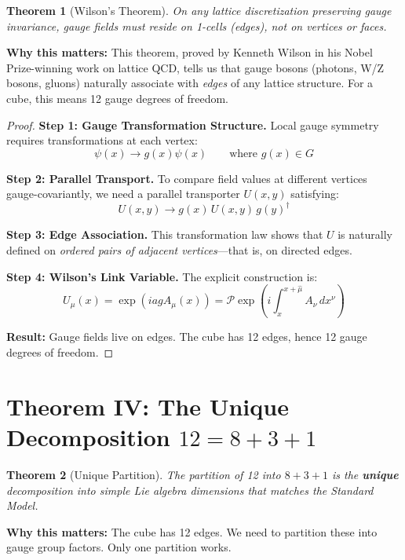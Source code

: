 \documentclass[11pt,a4paper]{article}
\theoremstyle{plain}
\newtheorem{theorem}{Theorem}[section]
\theoremstyle{definition}
\theoremstyle{remark}
\begin{document}
\begin{theorem}[Wilson's Theorem]
On any lattice discretization preserving gauge invariance, gauge fields must reside on 1-cells (edges), not on vertices or faces.
\end{theorem}

\textbf{Why this matters:} This theorem, proved by Kenneth Wilson in his Nobel Prize-winning work on lattice QCD, tells us that gauge bosons (photons, W/Z bosons, gluons) naturally associate with \emph{edges} of any lattice structure. For a cube, this means 12 gauge degrees of freedom.

\begin{proof}
\textbf{Step 1: Gauge Transformation Structure.} Local gauge symmetry requires transformations at each vertex:
\[
\psi(x) \to g(x)\psi(x) \qquad \text{where } g(x) \in G
\]

\textbf{Step 2: Parallel Transport.} To compare field values at different vertices gauge-covariantly, we need a parallel transporter $U(x,y)$ satisfying:
\[
U(x,y) \to g(x) \, U(x,y) \, g(y)^\dagger
\]

\textbf{Step 3: Edge Association.} This transformation law shows that $U$ is naturally defined on \emph{ordered pairs of adjacent vertices}---that is, on directed edges.

\textbf{Step 4: Wilson's Link Variable.} The explicit construction is:
\[
U_\mu(x) = \exp\left(iagA_\mu(x)\right) = \mathcal{P}\exp\left(i\int_x^{x+\hat{\mu}} A_\nu \, dx^\nu\right)
\]

\textbf{Result:} Gauge fields live on edges. The cube has 12 edges, hence 12 gauge degrees of freedom.
\end{proof}

\section{Theorem IV: The Unique Decomposition $12 = 8 + 3 + 1$}

\begin{theorem}[Unique Partition]
The partition of 12 into $8 + 3 + 1$ is the \textbf{unique} decomposition into simple Lie algebra dimensions that matches the Standard Model.
\end{theorem}

\textbf{Why this matters:} The cube has 12 edges. We need to partition these into gauge group factors. Only one partition works.
\end{document}
